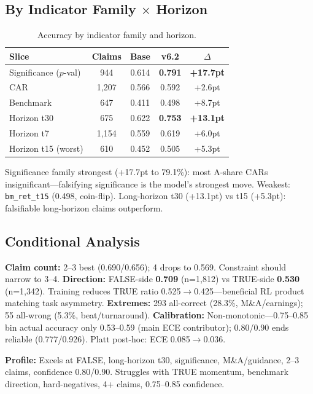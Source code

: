 \documentclass[sigconf, anonymous, review]{acmart}
\begin{document}
\subsection{By Indicator Family $\times$ Horizon}

\begin{table}[t]
\centering\small
\caption{Accuracy by indicator family and horizon.}
\label{tab:byfamily}
\begin{tabular}{@{}lcccc@{}}
\toprule
Slice & Claims & Base & v6.2 & $\Delta$ \\
\midrule
Significance ($p$-val) & 944 & 0.614 & \textbf{0.791} & \textbf{+17.7pt} \\
CAR & 1,207 & 0.566 & 0.592 & +2.6pt \\
Benchmark & 647 & 0.411 & 0.498 & +8.7pt \\
Horizon t30 & 675 & 0.622 & \textbf{0.753} & \textbf{+13.1pt} \\
Horizon t7 & 1,154 & 0.559 & 0.619 & +6.0pt \\
Horizon t15 (worst) & 610 & 0.452 & 0.505 & +5.3pt \\
\bottomrule
\end{tabular}
\end{table}

Significance family strongest (+17.7pt to 79.1\%): most A-share CARs insignificant---falsifying significance is the model's strongest move. Weakest: \texttt{bm\_ret\_t15} (0.498, coin-flip). Long-horizon t30 (+13.1pt) vs t15 (+5.3pt): falsifiable long-horizon claims outperform.

\subsection{Conditional Analysis}

\textbf{Claim count:} 2--3 best (0.690/0.656); 4 drops to 0.569. Constraint should narrow to 3--4.
\textbf{Direction:} FALSE-side \textbf{0.709} (n=1,812) vs TRUE-side \textbf{0.530} (n=1,342). Training reduces TRUE ratio 0.525$\to$0.425---beneficial RL product matching task asymmetry.
\textbf{Extremes:} 293 all-correct (28.3\%, M\&A/earnings); 55 all-wrong (5.3\%, beat/turnaround).
\textbf{Calibration:} Non-monotonic---0.75--0.85 bin actual accuracy only 0.53--0.59 (main ECE contributor); 0.80/0.90 ends reliable (0.777/0.926). Platt post-hoc: ECE 0.085$\to$0.036.

\textbf{Profile:} Excels at FALSE, long-horizon t30, significance, M\&A/guidance, 2--3 claims, confidence 0.80/0.90. Struggles with TRUE momentum, benchmark direction, hard-negatives, 4+ claims, 0.75--0.85 confidence.
\end{document}
